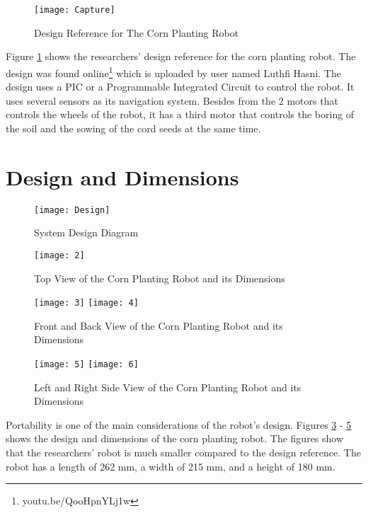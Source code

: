 \begin{figure}[!htbp]
	\centering
		\texttt{[image: Capture]}
	\caption{Design Reference for The Corn Planting Robot}
	\label{fig:reference}
\end{figure}

Figure \ref{fig:reference} shows the researchers’ design reference for the corn planting robot. The design was found online\footnote{youtu.be/QooHpnYLj1w} which is uploaded by user named Luthfi Hasni. The design uses a PIC or a Programmable Integrated Circuit to control the robot. It uses several sensors as its navigation system. Besides from the 2 motors that controls the wheels of the robot, it has a third motor that controls the boring of the soil and the sowing of the cord seeds at the same time. 

\section{Design and Dimensions}

\begin{figure}[!htbp]
	\centering
		\texttt{[image: Design]}
	\caption{System Design Diagram}
	\label{fig:Design}
\end{figure}

\begin{figure}[!htbp]
	\centering
		\texttt{[image: 2]}
	\caption{Top View of the Corn Planting Robot and its Dimensions}
	\label{fig:1}
\end{figure}

\begin{figure}[!htbp]
	\centering
		\texttt{[image: 3]}
		\texttt{[image: 4]}
	\caption{Front and Back View of the Corn Planting Robot and its Dimensions}
	\label{fig:2}
\end{figure}

\begin{figure}[!htbp]
	\centering
		\texttt{[image: 5]}
		\texttt{[image: 6]}
	\caption{Left and Right Side View of the Corn Planting Robot and its Dimensions}
	\label{fig:3}
\end{figure}

Portability is one of the main considerations of the robot’s design. Figures \ref{fig:1} - \ref{fig:3} shows the design and dimensions of the corn planting robot. The figures show that the researchers’ robot is much smaller compared to the design reference. The robot has a length of 262 mm, a width of 215 mm, and a height of 180 mm.

